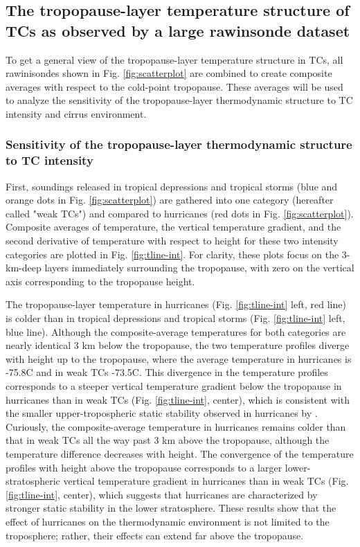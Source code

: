 \subsection{The tropopause-layer temperature structure of TCs as observed by a large rawinsonde dataset}

To get a general view of the tropopause-layer temperature structure in TCs, all rawinisondes shown in Fig. \ref{fig:scatterplot} are combined to create composite averages with respect to the cold-point tropopause.
These averages will be used to analyze the sensitivity of the tropopause-layer thermodynamic structure to TC intensity and cirrus environment.

\subsubsection{Sensitivity of the tropopause-layer thermodynamic structure to TC intensity}
First, soundings released in tropical depressions and tropical storms (blue and orange dots in Fig. \ref{fig:scatterplot}) are gathered into one category (hereafter called "weak TCs") and compared to hurricanes (red dots in Fig. \ref{fig:scatterplot}).
Composite averages of temperature, the vertical temperature gradient, and the second derivative of temperature with respect to height for these two intensity categories are plotted in Fig. \ref{fig:tline-int}.
For clarity, these plots focus on the 3-km-deep layers immediately surrounding the tropopause, with zero on the vertical axis corresponding to the tropopause height.

The tropopause-layer temperature in hurricanes (Fig. \ref{fig:tline-int} left, red line) is colder than in tropical depressions and tropical storms (Fig. \ref{fig:tline-int} left, blue line).
Although the composite-average temperatures for both categories are nearly identical 3 km below the tropopause, the two temperature profiles diverge with height up to the tropopause, where the average temperature in hurricanes is -75.8\textdegree{}C and in weak TCs -73.5\textdegree{}C.
This divergence in the temperature profiles corresponds to a steeper vertical temperature gradient below the tropopause in hurricanes than in weak TCs (Fig. \ref{fig:tline-int}, center), which is consistent with the smaller upper-tropospheric static stability observed in hurricanes by \cite{DuranMolinari2016}.
Curiously, the composite-average temperature in hurricanes remains colder than that in weak TCs all the way past 3 km above the tropopause, although the temperature difference decreases with height.
The convergence of the temperature profiles with height above the tropopause corresponds to a larger lower-stratospheric vertical temperature gradient in hurricanes than in weak TCs (Fig. \ref{fig:tline-int}, center), which suggests that hurricanes are characterized by stronger static stability in the lower stratosphere.
These results show that the effect of hurricanes on the thermodynamic environment is not limited to the troposphere; rather, their effects can extend far above the tropopause.

